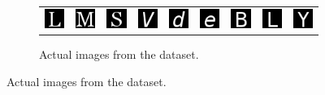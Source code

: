 {\begin{figure}
	\begin{subfigure}[t]{\textwidth}
		\begin{tabu} to \textwidth {XXXXXXXXX}
			\includegraphics[scale=1]{tensors/sandc/valid/real/Georgia-76} &
			\includegraphics[scale=1]{tensors/sandc/valid/real/Georgia-77} &
			\includegraphics[scale=1]{tensors/sandc/valid/real/Georgia-83} &
			\includegraphics[scale=1]{tensors/sandc/valid/real/VeraMoIt-86} &
			\includegraphics[scale=1]{tensors/sandc/valid/real/VeraMoIt-100} &
			\includegraphics[scale=1]{tensors/sandc/valid/real/VeraMoIt-101} &
			\includegraphics[scale=1]{tensors/sandc/valid/real/VeraMono-66} &
			\includegraphics[scale=1]{tensors/sandc/valid/real/VeraMono-76} &
			\includegraphics[scale=1]{tensors/sandc/valid/real/VeraMono-89} 
		\end{tabu}
		\caption{Actual images from the dataset.}
	\end{subfigure}
	

\end{figure}}

